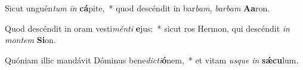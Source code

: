 \item Sicut unguén\textit{tum} \textit{in} \textbf{cá}pite,~* quod descéndit in bar\textit{bam}, \textit{bar}\textit{bam} \textbf{A}\textbf{a}ron.
\item Quod descéndit in oram vesti\textit{mén}\textit{ti} \textbf{e}jus:~* sicut ros Hermon, qui descéndit \textit{in} \textit{mon}\textit{tem} \textbf{Si}on.
\item Quóniam illic mandávit Dóminus bene\textit{dic}\textit{ti}\textbf{ó}nem,~* et vitam \textit{us}\textit{que} \textit{in} \textbf{sǽ}\textbf{cu}lum.
